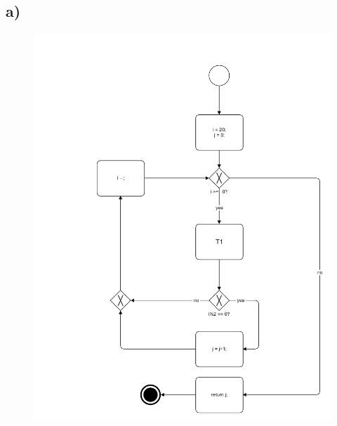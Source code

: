 \documentclass{article}
\begin{document}
		\subsection*{a)}
			\begin{figure}[h!]
				\includegraphics[scale=0.2]{aufgabe_9_3_a.jpg}
			\end{figure}
		
	\pagebreak
	
\end{document}
